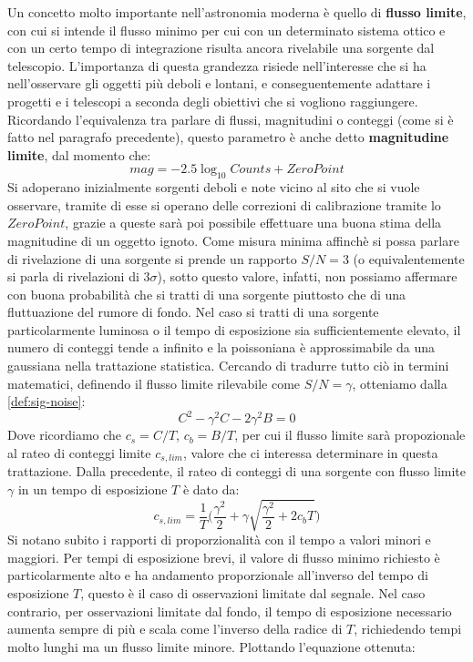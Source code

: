 Un concetto molto importante nell'astronomia moderna è quello di \textbf{flusso limite}, con cui si intende il flusso minimo per cui con un determinato sistema ottico e con un certo tempo di integrazione risulta ancora rivelabile una sorgente dal telescopio. L'importanza di questa grandezza risiede nell'interesse che si ha nell'osservare gli oggetti più deboli e lontani, e conseguentemente adattare i progetti e i telescopi a seconda degli obiettivi che si vogliono raggiungere. Ricordando l'equivalenza tra parlare di flussi, magnitudini o conteggi (come si è fatto nel paragrafo precedente), questo parametro è anche detto \textbf{magnitudine limite}, dal momento che:
\begin{equation}
	\label{eq:lim-flux-conversione-cont-mag}
    mag=-2.5\log_{10}{Counts}+ZeroPoint
\end{equation}
Si adoperano inizialmente sorgenti deboli e note vicino al sito che si vuole osservare, tramite di esse si operano delle correzioni di calibrazione tramite lo $ZeroPoint$, grazie a queste sarà poi possibile effettuare una buona stima della magnitudine di un oggetto ignoto. Come misura minima affinchè si possa parlare di rivelazione di una sorgente si prende un rapporto $S/N=3$ (o equivalentemente si parla di rivelazioni di $3\sigma$), sotto questo valore, infatti, non possiamo affermare con buona probabilità che si tratti di una sorgente piuttosto che di una fluttuazione del rumore di fondo. Nel caso si tratti di una sorgente particolarmente luminosa o il tempo di esposizione sia sufficientemente elevato, il numero di conteggi tende a infinito e la poissoniana è approssimabile da una gaussiana nella trattazione statistica. Cercando di tradurre tutto ciò in termini matematici, definendo il flusso limite rilevabile come $S/N=\gamma$, otteniamo dalla \ref{def:sig-noise}:
\begin{equation*}
    C^2-\gamma^2C-2\gamma^2B=0
\end{equation*}
Dove ricordiamo che $c_s=C/T$, $c_b=B/T$, per cui il flusso limite sarà propozionale al rateo di conteggi limite $c_{s,lim}$, valore che ci interessa determinare in questa trattazione. Dalla precedente, il rateo di conteggi di una sorgente con flusso limite $\gamma$ in un tempo di esposizione $T$ è dato da:
\begin{equation*}
    c_{s,lim} = \frac{1}{T} \Biggl( \frac{\gamma^2}{2}+\gamma\sqrt{\frac{\gamma^2}{2} + 2c_bT} \Biggr)
\end{equation*}
Si notano subito i rapporti di proporzionalità con il tempo a valori minori e maggiori. Per tempi di esposizione brevi, il valore di flusso minimo richiesto è particolarmente alto e ha andamento proporzionale all'inverso del tempo di esposizione $T$, questo è il caso di osservazioni limitate dal segnale. Nel caso contrario, per osservazioni limitate dal fondo, il tempo di esposizione necessario aumenta sempre di più e scala come l'inverso della radice di $T$, richiedendo tempi molto lunghi ma un flusso limite minore. Plottando l'equazione ottenuta:

